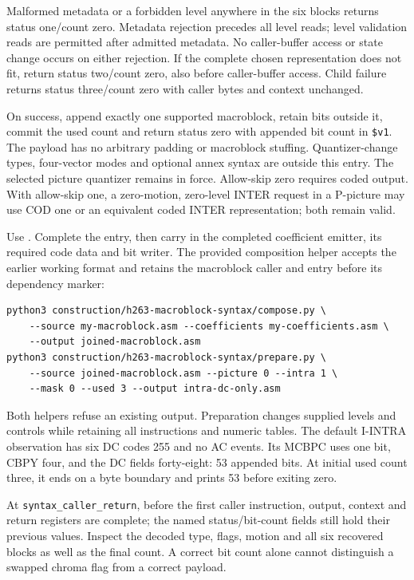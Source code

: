 Malformed metadata or a forbidden level anywhere in the six blocks returns status
one/count zero. Metadata rejection precedes all level reads; level validation
reads are permitted after admitted metadata. No caller-buffer access or state
change occurs on either rejection. If the complete chosen representation does not
fit, return status two/count zero, also before caller-buffer access. Child failure
returns status three/count zero with caller bytes and context unchanged.

On success, append exactly one supported macroblock, retain bits outside it, commit
the used count and return status zero with appended bit count in \texttt{\$v1}.
The payload has no arbitrary padding or macroblock stuffing. Quantizer-change types,
four-vector modes and optional annex syntax are outside this entry. The selected
picture quantizer remains in force. Allow-skip zero requires coded output. With
allow-skip one, a zero-motion, zero-level INTER request in a P-picture may use
COD one or an equivalent coded INTER representation; both remain valid.

Use . Complete the entry, then carry
in the completed coefficient emitter, its required code data and bit writer.
The provided composition helper accepts the earlier working format and retains
the macroblock caller and entry before its dependency marker:
\begin{verbatim}
python3 construction/h263-macroblock-syntax/compose.py \
    --source my-macroblock.asm --coefficients my-coefficients.asm \
    --output joined-macroblock.asm
python3 construction/h263-macroblock-syntax/prepare.py \
    --source joined-macroblock.asm --picture 0 --intra 1 \
    --mask 0 --used 3 --output intra-dc-only.asm
\end{verbatim}
Both helpers refuse an existing output. Preparation changes supplied levels and
controls while retaining all instructions and numeric tables. The default I-INTRA
observation has six DC codes 255 and no AC events. Its MCBPC uses one bit, CBPY
four, and the DC fields forty-eight: 53 appended bits. At initial used count
three, it ends on a byte boundary and prints 53 before exiting zero.

At \texttt{syntax\_caller\_return}, before the first caller instruction, output,
context and return registers are complete; the named status/bit-count fields
still hold their previous values. Inspect the decoded type, flags, motion and
all six recovered blocks as well as the final count. A correct bit count alone
cannot distinguish a swapped chroma flag from a correct payload.
